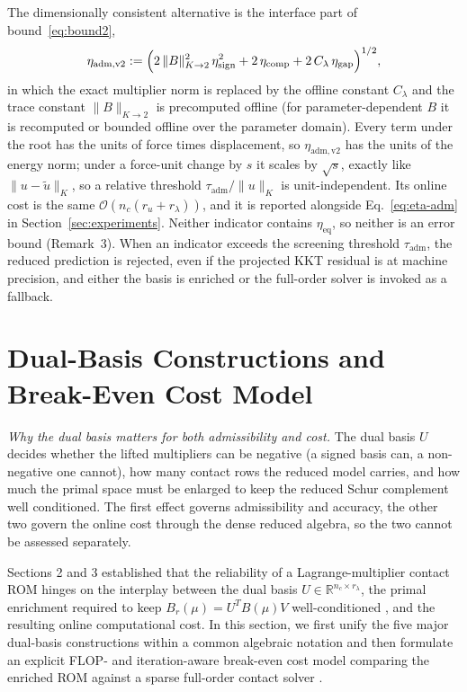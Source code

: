 \documentclass[11pt,a4paper]{article}
\begin{document}
The dimensionally consistent alternative is the interface part of bound~\eqref{eq:bound2},
\begin{equation}\label{eq:eta-adm-v2}
\eta_{\mathrm{adm,v2}} := \Bigl(2\,\|B\|_{K \to 2}^2\,\eta_{\mathrm{sign}}^2 + 2\,\eta_{\mathrm{comp}} + 2\,C_\lambda\,\eta_{\mathrm{gap}}\Bigr)^{1/2},
\end{equation}
in which the exact multiplier norm is replaced by the offline constant \(C_\lambda\) and the trace constant \(\|B\|_{K \to 2}\) is precomputed offline (for parameter-dependent \(B\) it is recomputed or bounded offline over the parameter domain). Every term under the root has the units of force times displacement, so \(\eta_{\mathrm{adm,v2}}\) has the units of the energy norm; under a force-unit change by \(s\) it scales by \(\sqrt{s}\), exactly like \(\|u - \tilde{u}\|_K\), so a relative threshold \(\tau_{\mathrm{adm}}/\|u\|_K\) is unit-independent. Its online cost is the same \(\mathcal{O}(n_c (r_u + r_\lambda))\), and it is reported alongside Eq.~\eqref{eq:eta-adm} in Section~\ref{sec:experiments}. Neither indicator contains \(\eta_{\mathrm{eq}}\), so neither is an error bound (Remark~3). When an indicator exceeds the screening threshold \(\tau_{\mathrm{adm}}\), the reduced prediction is rejected, even if the projected KKT residual is at machine precision, and either the basis is enriched or the full-order solver is invoked as a fallback.

\section{Dual-Basis Constructions and Break-Even Cost Model}
\label{sec:basis_cost}

\emph{Why the dual basis matters for both admissibility and cost.} The dual basis $U$ decides whether the lifted multipliers can be negative (a signed basis can, a non-negative one cannot), how many contact rows the reduced model carries, and how much the primal space must be enlarged to keep the reduced Schur complement well conditioned. The first effect governs admissibility and accuracy, the other two govern the online cost through the dense reduced algebra, so the two cannot be assessed separately.

Sections 2 and 3 established that the reliability of a Lagrange-multiplier contact ROM hinges on the interplay between the dual basis \(U \in \mathbb{R}^{n_c \times r_\lambda}\), the primal enrichment required to keep \(B_r(\mu) = U^T B(\mu) V\) well-conditioned \cite{benaceur2020reduced, leberre2022condition}, and the resulting online computational cost. In this section, we first unify the five major dual-basis constructions within a common algebraic notation and then formulate an explicit FLOP- and iteration-aware break-even cost model comparing the enriched ROM against a sparse full-order contact solver \cite{franceschini2022block, pawar2025efficient}.
\end{document}
